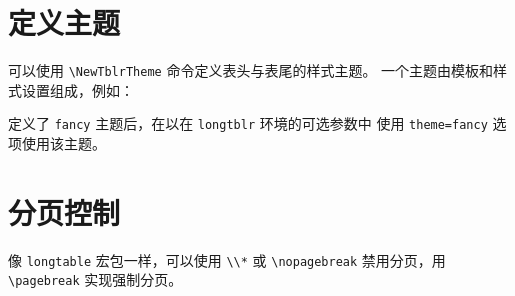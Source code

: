 \documentclass[oneside]{book}
\begin{document}
\section{定义主题}

可以使用 \verb!\NewTblrTheme! 命令定义表头与表尾的样式主题。
一个主题由模板和样式设置组成，例如：
\nopagebreak
\begin{codehigh}
\end{codehigh}

定义了 \verb!fancy! 主题后，在以在 \verb!longtblr! 环境的可选参数中
使用 \verb!theme=fancy! 选项使用该主题。

\section{分页控制}

像 \verb!longtable! 宏包一样，可以使用 \verb!\\*! 或 \verb!\nopagebreak!
禁用分页，用 \verb!\pagebreak! 实现强制分页。
\end{document}
